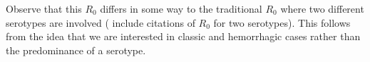         Observe that this $R_0$ differs in some way to the traditional $R_0$ where two
    different serotypes are involved (\cite{Feng1997a} include citations of $R_0$ 
    for two serotypes).
    This follows from the idea that we are interested in classic and hemorrhagic
    cases rather than the predominance of a serotype.




